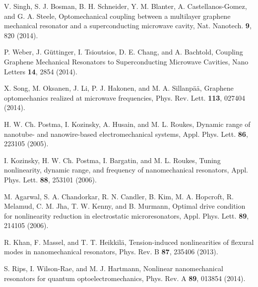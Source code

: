 \documentclass[aps,twocolumn,groupedaddress,superscriptaddress,floatfix,amsmath,amssymb,prb]{revtex4-1}
\begin{document}
\begin{thebibliography}{99}
V. Singh, S. J. Bosman, B. H. Schneider, Y. M. Blanter, A. Castellanos-Gomez, and G. A. Steele, 
{Optomechanical coupling between a multilayer graphene mechanical resonator and a superconducting microwave cavity}, 
Nat. Nanotech. \textbf{9}, 820 (2014).

P. Weber, J. G\"{u}ttinger, I. Tsioutsios, D. E. Chang, and A. Bachtold,
{Coupling Graphene Mechanical Resonators to Superconducting Microwave Cavities}, 
Nano Letters \textbf{14}, 2854 (2014).

X. Song, M. Oksanen, J. Li, P. J. Hakonen, and M. A. Sillanp\"{a}\"{a}, 
{Graphene optomechanics realized at microwave frequencies}, 
Phys. Rev. Lett. \textbf{113}, 027404 (2014).

H. W. Ch. Postma, I. Kozinsky, A. Husain, and M. L. Roukes,
{Dynamic range of nanotube- and nanowire-based electromechanical systems}, 
Appl. Phys. Lett. {\bf 86}, 223105 (2005).

I. Kozinsky, H. W. Ch. Postma, I. Bargatin, and M. L. Roukes,
{Tuning nonlinearity, dynamic range, and frequency of nanomechanical resonators}, 
Appl. Phys. Lett. {\bf 88}, 253101 (2006).

M. Agarwal, S. A. Chandorkar, R. N. Candler, B. Kim, M. A. Hopcroft, R. Melamud, C. M. Jha, T. W. Kenny, and B. Murmann,
{Optimal drive condition for nonlinearity reduction in electrostatic microresonators}, 
Appl. Phys. Lett. {\bf 89}, 214105 (2006).

R. Khan, F. Massel, and T. T. Heikkil\"{a},
{Tension-induced nonlinearities of flexural modes in nanomechanical resonators}, 
Phys. Rev. B \textbf{87}, 235406 (2013).

S. Rips, I. Wilson-Rae, and M. J. Hartmann, 
{Nonlinear nanomechanical resonators for quantum optoelectromechanics}, 
Phys. Rev. A \textbf{89}, 013854 (2014).


\end{thebibliography}
\end{document}
